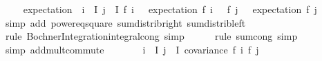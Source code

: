 \begin{isabellebody}
\ \isamarkupfalse%
\ {\isachardoublequoteopen}{\isachardot}{\kern0pt}{\isachardot}{\kern0pt}{\isachardot}{\kern0pt}\ {\isacharequal}{\kern0pt}\ expectation\ {\isacharparenleft}{\kern0pt}{\isasymlambda}{\isasymomega}{\isachardot}{\kern0pt}\ {\isacharparenleft}{\kern0pt}{\isasymSum}i\ {\isasymin}\ I{\isachardot}{\kern0pt}\ {\isacharparenleft}{\kern0pt}{\isasymSum}j\ {\isasymin}\ I{\isachardot}{\kern0pt}\ {\isacharparenleft}{\kern0pt}f\ i\ {\isasymomega}\ {\isacharminus}{\kern0pt}\ expectation\ {\isacharparenleft}{\kern0pt}f\ i{\isacharparenright}{\kern0pt}{\isacharparenright}{\kern0pt}\ {\isacharasterisk}{\kern0pt}\ \ {\isacharparenleft}{\kern0pt}f\ j\ {\isasymomega}\ {\isacharminus}{\kern0pt}\ expectation\ {\isacharparenleft}{\kern0pt}f\ j{\isacharparenright}{\kern0pt}{\isacharparenright}{\kern0pt}{\isacharparenright}{\kern0pt}{\isacharparenright}{\kern0pt}{\isacharparenright}{\kern0pt}{\isachardoublequoteclose}\isanewline
\ \ \ \ \isamarkupfalse%
\ {\isacharparenleft}{\kern0pt}simp\ add{\isacharcolon}{\kern0pt}\ power{}{\isacharunderscore}{\kern0pt}eq{\isacharunderscore}{\kern0pt}square\ sum{\isacharunderscore}{\kern0pt}distrib{\isacharunderscore}{\kern0pt}right\ sum{\isacharunderscore}{\kern0pt}distrib{\isacharunderscore}{\kern0pt}left{\isacharparenright}{\kern0pt}\isanewline
\ \ \ \ \isamarkupfalse%
\ {\isacharparenleft}{\kern0pt}rule\ Bochner{\isacharunderscore}{\kern0pt}Integration{\isachardot}{\kern0pt}integral{\isacharunderscore}{\kern0pt}cong{\isacharcomma}{\kern0pt}\ simp{\isacharparenright}{\kern0pt}\isanewline
\ \ \ \ \isamarkupfalse%
\ {\isacharparenleft}{\kern0pt}rule\ sum{\isachardot}{\kern0pt}cong{\isacharcomma}{\kern0pt}\ simp{\isacharparenright}{\kern0pt}{\isacharplus}{\kern0pt}\isanewline
\ \ \ \ \isamarkupfalse%
\ {\isacharparenleft}{\kern0pt}simp\ add{\isacharcolon}{\kern0pt}mult{\isachardot}{\kern0pt}commute{\isacharparenright}{\kern0pt}\isanewline
\ \ \isamarkupfalse%
\ \isamarkupfalse%
\ {\isachardoublequoteopen}{\isachardot}{\kern0pt}{\isachardot}{\kern0pt}{\isachardot}{\kern0pt}\ {\isacharequal}{\kern0pt}\ {\isacharparenleft}{\kern0pt}{\isasymSum}i\ {\isasymin}\ I{\isachardot}{\kern0pt}\ {\isacharparenleft}{\kern0pt}{\isasymSum}j\ {\isasymin}\ I{\isachardot}{\kern0pt}\ covariance\ {\isacharparenleft}{\kern0pt}f\ i{\isacharparenright}{\kern0pt}\ {\isacharparenleft}{\kern0pt}f\ j{\isacharparenright}{\kern0pt}{\isacharparenright}{\kern0pt}{\isacharparenright}{\kern0pt}{\isachardoublequoteclose}\isanewline

\end{isabellebody}
